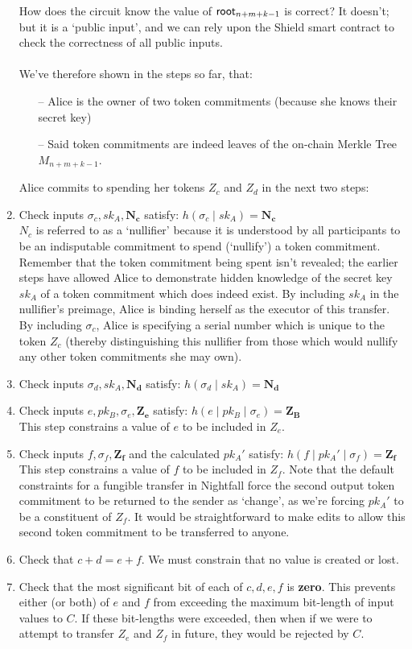 \begin{enumerate}
    How does the circuit know the value of $\mathsf{root}_{n+m+k-1}$ is correct? It doesn't; but it is a `public input', and we can rely upon the Shield smart contract to check the correctness of all public inputs.\\
  \\
  We've therefore shown in the steps so far, that:
  \begin{itemize}
    \item[--] Alice is the owner of two token commitments (because she knows their secret key)
    \item[--] Said token commitments are indeed leaves of the on-chain Merkle Tree $M_{n+m+k-1}$.
  \end{itemize}

  Alice commits to spending her tokens $Z_c$ and $Z_d$ in the next two steps:
  \item Check inputs $\sigma_c, sk_A, \bm{N_c}$ satisfy:
    $h(\sigma_c\;|\;sk_A) = \bm{N_c}$\\
    $N_c$ is referred to as a `nullifier' because it is understood by all participants to be an indisputable commitment to spend (`nullify') a token commitment. Remember that the token commitment being spent isn't revealed; the earlier steps have allowed Alice to demonstrate hidden knowledge of the secret key $sk_A$ of a token commitment which does indeed exist. By including $sk_A$ in the nullifier's preimage, Alice is binding herself as the executor of this transfer. By including $\sigma_c$, Alice is specifying a serial number which is unique to the token $Z_c$ (thereby distinguishing this nullifier from those which would nullify any other token commitments she may own).\\
  \item Check inputs $\sigma_d, sk_A, \bm{N_d}$ satisfy:
    $h(\sigma_d\;|\;sk_A) = \bm{N_d}$\\
  \item Check inputs $e, pk_B, \sigma_e, \bm{Z_e}$ satisfy:
    $h(e\;|\;pk_B\;|\;\sigma_e) = \bm{Z_B}$\\
    This step constrains a value of $e$ to be included in $Z_e$.
  \item Check inputs $f, \sigma_f, \bm{Z_f}$ and the calculated $pk_A'$ satisfy:
    $h(f\;|\;pk_A'\;|\;\sigma_f) = \bm{Z_f}$\\
    This step constrains a value of $f$ to be included in $Z_f$. Note that the default constraints for a fungible transfer in Nightfall force the second output token commitment to be returned to the sender as `change', as we're forcing $pk_A'$ to be a constituent of $Z_f$. It would be straightforward to make edits to allow this second token commitment to be transferred to anyone.
  \item Check that $c + d \bm{=} e + f$. We must constrain that no value is created or lost.
  \item Check that the most significant bit of each of $c, d, e, f$ is \textbf{zero}. This prevents either (or both) of $e$ and $f$ from exceeding the maximum bit-length of input values to $C$. If these bit-lengths were exceeded, then when if we were to attempt to transfer $Z_e$ and $Z_f$ in future, they would be rejected by $C$.

\end{enumerate}
